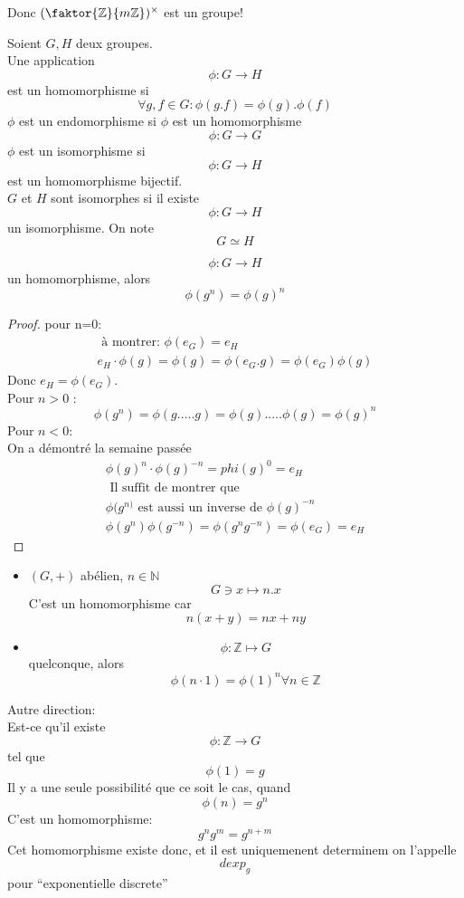 \documentclass[../main.tex]{subfiles}
\begin{document}
Donc $(  \faktor { \mathbb{Z}}{ m \mathbb{Z}})^{\times}$ est un groupe!
\begin{defn}\label{defn:homomorphismes_de_groupes}
	Soient $G,H$ deux groupes.\\
	Une application
	\[ 
	\phi: G \to H
	\]
	est un homomorphisme si 
	\[ 
		\forall g,f \in G: \phi(g.f) = \phi(g) . \phi(f)
	\]
	$\phi$ est un endomorphisme si $\phi$ est un homomorphisme 
	\[ 
	\phi: G \to G
	\]
	$\phi$ est un isomorphisme si 
	\[ 
	\phi: G \to H
	\]
	est un homomorphisme bijectif.\\
$G$ et $H$ sont isomorphes si il existe
\[ 
	\phi: G \to H
\]
un isomorphisme. On note
\[ 
G \simeq H
\]

	
\end{defn}
\begin{lemma}
\[ 
\phi: G \to H
\]
un homomorphisme, alors
\[ 
	\phi ( g^{n}) = \phi(g)^{n}
\]
\end{lemma}
\begin{proof}
pour n=0:\\
\begin{align*}
\text{ à montrer: } \phi(e_G) = e_H\\
e_H \cdot \phi(g) = \phi(g) = \phi(e_G.g) = \phi(e_G) \phi(g)
\end{align*}
Donc $e_H = \phi(e_G)$.\\
Pour $n>0$ :
\[ 
	\phi(g^{n}) = \phi(g. \ldots. g) = \phi(g). \ldots . \phi(g) = \phi(g)^{n}
\]
Pour $n<0$:\\
On a démontré la semaine passée
\begin{align*}
\phi(g)^{n} \cdot \phi(g)^{-n} = phi(g)^{0} = e_H\\
\text{ Il suffit de montrer que } \\
\phi(g^{n)} \text{ est aussi un inverse de } \phi(g)^{-n}\\
\phi(g^{n}) \phi(g^{-n}) = \phi(g^{n} g^{-n}) = \phi(e_G) = e_H
\end{align*}
\end{proof}
\begin{exemple}
\begin{itemize}
	\item  $ ( G,+)$ abélien, $n \in \mathbb{N}$ 
		\[ 
		G \ni x \mapsto n.x
		\]
	C'est un homomorphisme car
	\[ 
		n ( x+y) = nx + ny
	\]

\item 
	\[ 
	\phi: \mathbb{Z} \mapsto G
	\]
	quelconque, alors
	\[ 
		\phi(n\cdot 1) = \phi(1)^{n} \forall n \in \mathbb{Z}
	\]
	
	
		
\end{itemize}
\end{exemple}
Autre direction:\\
Est-ce qu'il existe
\[ 
\phi: \mathbb{Z} \to G
\]
tel que 
\[ 
	\phi(1) = g
\]
Il y a une seule possibilité que ce soit le cas, quand
\[ 
	\phi(n) = g^{n}
\]
C'est un homomorphisme:
\[ 
g^{n} g^{m} = g^{n+m}
\]
Cet homomorphisme existe donc, et il est uniquemenent determinem on l'appelle
\[ 
dexp_g
\]
pour ``exponentielle discrete'' 






	
\end{document}
